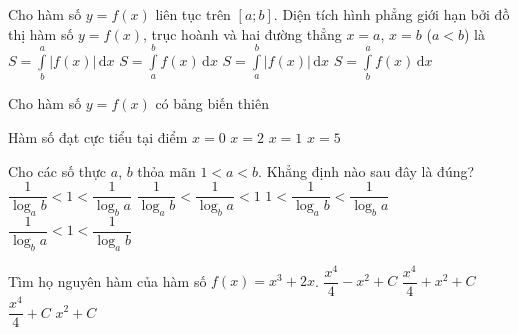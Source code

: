 \begin{ex}%
Cho hàm số $y=f(x)$ liên tục trên $[a;b]$. Diện tích hình phẳng giới hạn bởi đồ thị hàm số $y=f(x)$, trục hoành và hai đường thẳng $x=a$, $x=b$ ($a<b$) là
\choice
{$S=\displaystyle\int\limits_b^a \left| f(x) \right|\mathrm{\,d}x$}
{$S=\displaystyle\int\limits_a^b f(x)\mathrm{\,d}x$}
{\True $S=\displaystyle\int\limits_a^b \left| f(x) \right|\mathrm{\,d}x$}
{$S=\displaystyle\int\limits_b^a f(x)\mathrm{\,d}x$}
\end{ex}

\begin{ex}%
Cho hàm số $y=f(x)$ có bảng biến thiên
\begin{center}
\end{center}
Hàm số đạt cực tiểu tại điểm
\choice
{\True $x=0$}
{$x=2$}
{$x=1$}
{$x=5$}
\end{ex}

\begin{ex}%
Cho các số thực $a$, $b$ thỏa mãn $1<a<b$. Khẳng định nào sau đây là đúng?
\choice
{\True $\dfrac{1}{\log_a b}<1<\dfrac{1}{\log_b a}$}
{$\dfrac{1}{\log_a b}<\dfrac{1}{\log_b a}<1$}
{$1<\dfrac{1}{\log_a b}<\dfrac{1}{\log_b a}$}
{$\dfrac{1}{\log_b a}<1<\dfrac{1}{\log_a b}$}
\end{ex}

\begin{ex}%
Tìm họ nguyên hàm của hàm số $f(x)=x^3+2x$.
\choice
{$\dfrac{x^4}{4}-x^2+C$}
{\True $\dfrac{x^4}{4}+x^2+C$}
{$\dfrac{x^4}{4}+C$}
{$x^2+C$}
\end{ex}

